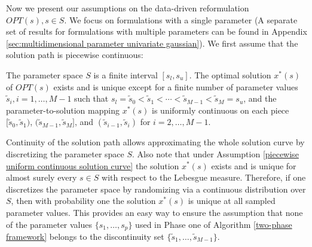 \documentclass[mnsc,blindrev]{informs4} %
\begin{document}
Now we present our assumptions on the data-driven reformulation $OPT(s),s\in S$. We focus on formulations with a single parameter (A separate set of results for formulations with multiple parameters can be found in Appendix \ref{sec:multidimensional parameter univariate gaussian}). We first assume that the solution path is piecewise continuous:
\begin{assumption}\label{piecewise uniform continuous solution curve}
The parameter space $S$ is a finite interval $[s_l,s_u]$. The optimal solution $x^*(s)$ of $OPT(s)$ exists and is unique except for a finite number of parameter values $\tilde s_i, i=1,\ldots,M-1$ such that $s_l=\tilde s_0< \tilde s_1<\cdots<\tilde s_{M-1}<\tilde s_{M}=s_u$, and the parameter-to-solution mapping $x^*(s)$ is uniformly continuous on each piece $[\tilde s_0,\tilde s_1)$, $(\tilde s_{M-1},\tilde s_M]$, and $(\tilde s_{i-1},\tilde s_i)$ for $i=2,\ldots,M-1$.
\end{assumption}
Continuity of the solution path allows approximating the whole solution curve by discretizing the parameter space $S$. Also note that under Assumption \ref{piecewise uniform continuous solution curve} the solution $x^*(s)$ exists and is unique for almost surely every $s\in S$ with respect to the Lebesgue measure. Therefore, if one discretizes the parameter space by randomizing via a continuous distribution over $S$, then with probability one the solution $x^*(s)$ is unique at all sampled parameter values. This provides an easy way to ensure the assumption that none of the parameter values $\{s_1,\ldots,s_p\}$ used in Phase one of Algorithm \ref{two-phase framework} belongs to the discontinuity set $\{\tilde s_1,\ldots,\tilde s_{M-1}\}$.


\end{document}

